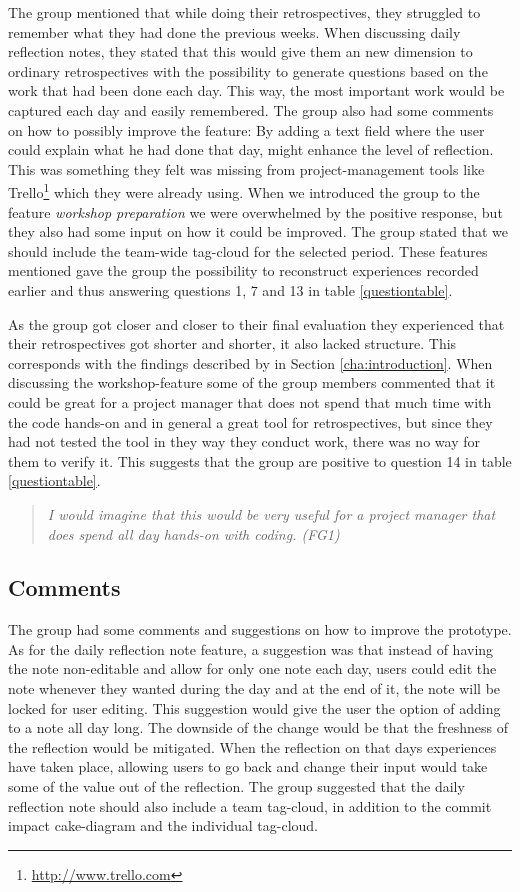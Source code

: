 The group mentioned that while doing their retrospectives, they struggled to remember what they had done the previous weeks. When discussing daily reflection notes, they stated that this would give them an new dimension to ordinary retrospectives with the possibility to generate questions based on the work that had been done each day. This way, the most important work would be captured each day and easily remembered. The group also had some comments on how to possibly improve the feature: By adding a text field where the user could explain what he had done that day, might enhance the level of reflection. This was something they felt was missing from project-management tools like Trello\footnote{\url{http://www.trello.com}} which they were already using. When we introduced the group to the feature \emph{workshop preparation} we were overwhelmed by the positive response, but they also had some input on how it could be improved. The group stated that we should include the team-wide tag-cloud for the selected period. These features mentioned gave the group the possibility to reconstruct experiences recorded earlier and thus answering questions 1, 7 and 13 in table \ref{questiontable}.

As the group got closer and closer to their final evaluation they experienced that their retrospectives got shorter and shorter, it also lacked structure. This corresponds with the findings described by \citep{kasi2008post} in Section \ref{cha:introduction}. When discussing the workshop-feature some of the group members commented that it could be great for a project manager that does not spend that much time with the code hands-on and in general a great tool for retrospectives, but since they had not tested the tool in they way they conduct work, there was no way for them to verify it. This suggests that the group are positive to question 14 in table \ref{questiontable}.

\begin{quote}
\emph{I would imagine that this would be very useful for a project manager that does spend all day hands-on with coding. (FG1)}
\end{quote}
\subsection{Comments}
The group had some comments and suggestions on how to improve the prototype. As for the daily reflection note feature, a suggestion was that instead of having the note non-editable and allow for only one note each day, users could edit the note whenever they wanted during the day and at the end of it, the note will be locked for user editing. This suggestion would give the user the option of adding to a note all day long. The downside of the change would be that the freshness of the reflection would be mitigated. When the reflection on that days experiences have taken place, allowing users to go back and change their input would take some of the value out of the reflection. The group suggested that the daily reflection note should also include a team tag-cloud, in addition to the commit impact cake-diagram and the individual tag-cloud.


